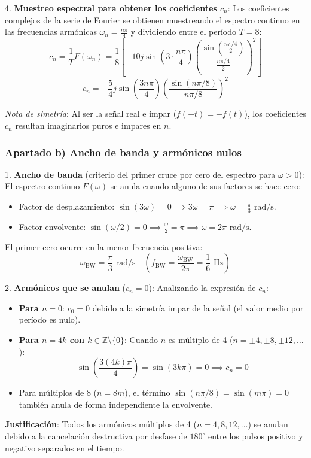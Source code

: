 \begin{resolucion}
4. \textbf{Muestreo espectral para obtener los coeficientes $c_n$}:
   Los coeficientes complejos de la serie de Fourier se obtienen muestreando el espectro continuo en las frecuencias armónicas $\omega_n = \frac{n\pi}{4}$ y dividiendo entre el período $T = 8$:
   \[
   c_n = \frac{1}{T} F(\omega_n) = \frac{1}{8} \left[ -10j \sin\left(3 \cdot \frac{n\pi}{4}\right) \left( \frac{\sin\left(\frac{n\pi/4}{2}\right)}{\frac{n\pi/4}{2}} \right)^2 \right]
   \]
   \[
   c_n = -\frac{5}{4}j \sin\left(\frac{3n\pi}{4}\right) \left( \frac{\sin(n\pi/8)}{n\pi/8} \right)^2
   \]

\textit{Nota de simetría}: Al ser la señal real e impar ($f(-t) = -f(t)$), los coeficientes $c_n$ resultan imaginarios puros e impares en $n$.

\vspace{0.3cm}

\subsubsection*{Apartado b) Ancho de banda y armónicos nulos}

1. \textbf{Ancho de banda} (criterio del primer cruce por cero del espectro para $\omega > 0$):
   El espectro continuo $F(\omega)$ se anula cuando alguno de sus factores se hace cero:
   \begin{itemize}[leftmargin=*]
       \item Factor de desplazamiento: $\sin(3\omega) = 0 \implies 3\omega = \pi \implies \omega = \frac{\pi}{3}\text{ rad/s}$.
       \item Factor envolvente: $\sin(\omega/2) = 0 \implies \frac{\omega}{2} = \pi \implies \omega = 2\pi\text{ rad/s}$.
   \end{itemize}
   El primer cero ocurre en la menor frecuencia positiva:
   \[
   \omega_{\text{BW}} = \frac{\pi}{3}\text{ rad/s} \quad \left( f_{\text{BW}} = \frac{\omega_{\text{BW}}}{2\pi} = \frac{1}{6}\text{ Hz} \right)
   \]

2. \textbf{Armónicos que se anulan} ($c_n = 0$):
   Analizando la expresión de $c_n$:
   \begin{itemize}[leftmargin=*]
       \item \textbf{Para $n = 0$}: $c_0 = 0$ debido a la simetría impar de la señal (el valor medio por período es nulo).
       \item \textbf{Para $n = 4k$ con $k \in \mathbb{Z} \setminus \{0\}$}: Cuando $n$ es múltiplo de 4 ($n = \pm 4, \pm 8, \pm 12, \dots$):
       \[
       \sin\left(\frac{3(4k)\pi}{4}\right) = \sin(3k\pi) = 0 \implies c_n = 0
       \]
       \item Para múltiplos de 8 ($n = 8m$), el término $\sin(n\pi/8) = \sin(m\pi) = 0$ también anula de forma independiente la envolvente.
   \end{itemize}
   \textbf{Justificación}: Todos los armónicos múltiplos de 4 ($n = 4, 8, 12, \dots$) se anulan debido a la cancelación destructiva por desfase de $180^\circ$ entre los pulsos positivo y negativo separados en el tiempo.


\end{resolucion}
